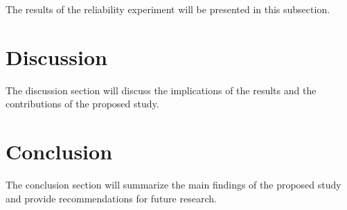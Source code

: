 \documentclass{article}
\begin{document}
The results of the reliability experiment will be presented in this subsection.

\section{Discussion}

The discussion section will discuss the implications of the results and the contributions of the proposed study.

\section{Conclusion}

The conclusion section will summarize the main findings of the proposed study and provide recommendations for future research.



\end{document}
